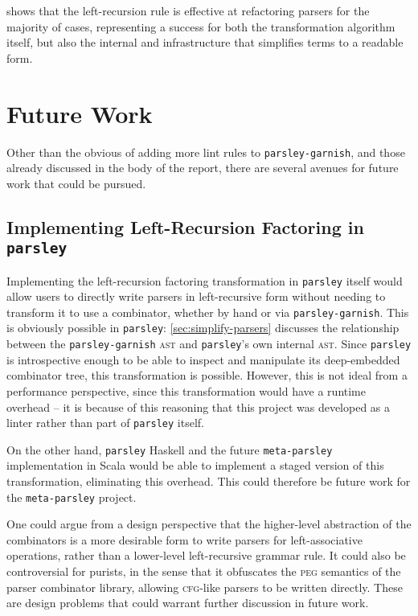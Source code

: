 \documentclass[../../main.tex]{subfiles}
\begin{document}
 shows that the left-recursion rule is effective at refactoring parsers for the majority of cases, representing a success for both the transformation algorithm itself, but also the internal  and  infrastructure that simplifies terms to a readable form.

\section{Future Work}
Other than the obvious of adding more lint rules to \texttt{parsley-garnish}, and those already discussed in the body of the report, there are several avenues for future work that could be pursued.

\subsection{Implementing Left-Recursion Factoring in \texttt{parsley}}
Implementing the left-recursion factoring transformation in \texttt{parsley} itself would allow users to directly write parsers in left-recursive form without needing to transform it to use a  combinator, whether by hand or via \texttt{parsley-garnish}.
This is obviously possible in \texttt{parsley}: \cref{sec:simplify-parsers} discusses the relationship between the \texttt{parsley-garnish}  \textsc{ast} and \texttt{parsley}'s own internal \textsc{ast}.
Since \texttt{parsley} is introspective enough to be able to inspect and manipulate its deep-embedded combinator tree, this transformation is possible.
However, this is not ideal from a performance perspective, since this transformation would have a runtime overhead -- it is because of this reasoning that this project was developed as a linter rather than part of \texttt{parsley} itself.

On the other hand, \texttt{parsley} Haskell and the future \texttt{meta-parsley} implementation in Scala would be able to implement a staged version of this transformation, eliminating this overhead.
This could therefore be future work for the \texttt{meta-parsley} project.

One could argue from a design perspective that the higher-level abstraction of the  combinators is a more desirable form to write parsers for left-associative operations, rather than a lower-level left-recursive grammar rule.
It could also be controversial for purists, in the sense that it obfuscates the \textsc{peg} semantics of the parser combinator library, allowing \textsc{cfg}-like parsers to be written directly.
These are design problems that could warrant further discussion in future work.
\end{document}
